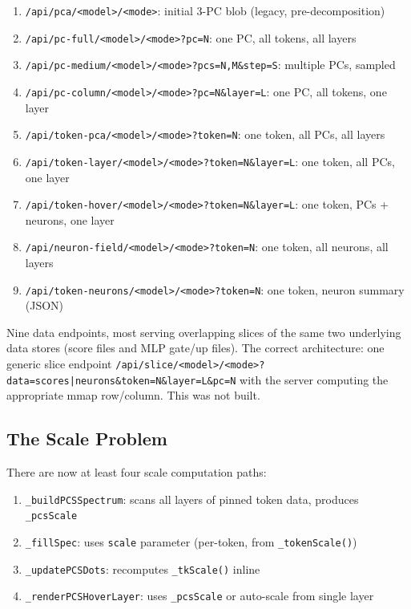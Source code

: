 \documentclass[11pt,a4paper]{article}
\begin{document}
\begin{enumerate}
  \item \texttt{/api/pca/<model>/<mode>}: initial 3-PC blob (legacy, pre-decomposition)
  \item \texttt{/api/pc-full/<model>/<mode>?pc=N}: one PC, all tokens, all layers
  \item \texttt{/api/pc-medium/<model>/<mode>?pcs=N,M\&step=S}: multiple PCs, sampled
  \item \texttt{/api/pc-column/<model>/<mode>?pc=N\&layer=L}: one PC, all tokens, one layer
  \item \texttt{/api/token-pca/<model>/<mode>?token=N}: one token, all PCs, all layers
  \item \texttt{/api/token-layer/<model>/<mode>?token=N\&layer=L}: one token, all PCs, one layer
  \item \texttt{/api/token-hover/<model>/<mode>?token=N\&layer=L}: one token, PCs + neurons, one layer
  \item \texttt{/api/neuron-field/<model>/<mode>?token=N}: one token, all neurons, all layers
  \item \texttt{/api/token-neurons/<model>/<mode>?token=N}: one token, neuron summary (JSON)
\end{enumerate}

Nine data endpoints, most serving overlapping slices of the same two underlying data stores (score files and MLP gate/up files). The correct architecture: one generic slice endpoint \texttt{/api/slice/<model>/<mode>?data=scores|neurons\&token=N\&layer=L\&pc=N} with the server computing the appropriate mmap row/column. This was not built.

\subsection{The Scale Problem}

There are now at least four scale computation paths:

\begin{enumerate}
  \item \texttt{\_buildPCSSpectrum}: scans all layers of pinned token data, produces \texttt{\_pcsScale}
  \item \texttt{\_fillSpec}: uses \texttt{scale} parameter (per-token, from \texttt{\_tokenScale()})
  \item \texttt{\_updatePCSDots}: recomputes \texttt{\_tkScale()} inline
  \item \texttt{\_renderPCSHoverLayer}: uses \texttt{\_pcsScale} or auto-scale from single layer
\end{enumerate}
\end{document}
